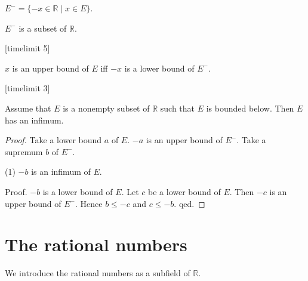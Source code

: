\documentclass{article}
\begin{document}
\begin{forthel}
\begin{definition}
$E^- = \{-x \in \mathbb{R} \mid x \in E\}$.
\end{definition}

\begin{lemma}
$E^-$ is a subset of $\mathbb{R}$.
\end{lemma}
[timelimit 5]
\begin{lemma}
$x$ is an upper bound of $E$ iff $-x$ is a lower bound of $E^-$.
\end{lemma}
[timelimit 3]

\begin{theorem}
Assume that $E$ is a nonempty subset of $\mathbb{R}$
such that $E$ is bounded below.
Then $E$ has an infimum.\end{theorem}
\begin{proof}
Take a lower bound $a$ of $E$.
$-a$ is an upper bound of $E^-$.
Take a supremum $b$ of $E^-$.

(1) $-b$ is an infimum of $E$.

Proof.
$-b$ is a lower bound of $E$.
Let $c$ be a lower bound of $E$.
Then $-c$ is an upper bound of $E^-$.
Hence $b \leq -c$ and $c \leq -b$.
qed.
\end{proof}
\end{forthel}


\section{The rational numbers}

We introduce the rational numbers
as a subfield of $\mathbb{R}$.
\end{document}
